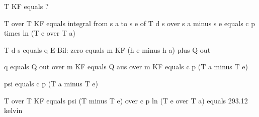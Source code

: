 T KF equals ?

T over T KF equals integral from s a to s e of T d s over s a minus s e equals c p times ln (T e over T a)

T d s equals q E-Bil: zero equals m KF (h e minus h a) plus Q out

q equals Q out over m KF equals Q aus over m KF equals c p (T a minus T e)

psi equals c p (T a minus T e)

T over T KF equals psi (T minus T e) over c p ln (T e over T a) equals 293.12 kelvin